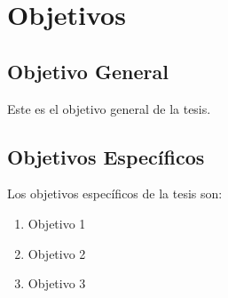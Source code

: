 \chapter{Objetivos}
\section{Objetivo General}
Este es el objetivo general de la tesis.
\section{Objetivos Específicos}
Los objetivos específicos de la tesis son:
\begin{enumerate}[leftmargin=2\parindent]
\item Objetivo 1
\item Objetivo 2
\item Objetivo 3
\end{enumerate}


